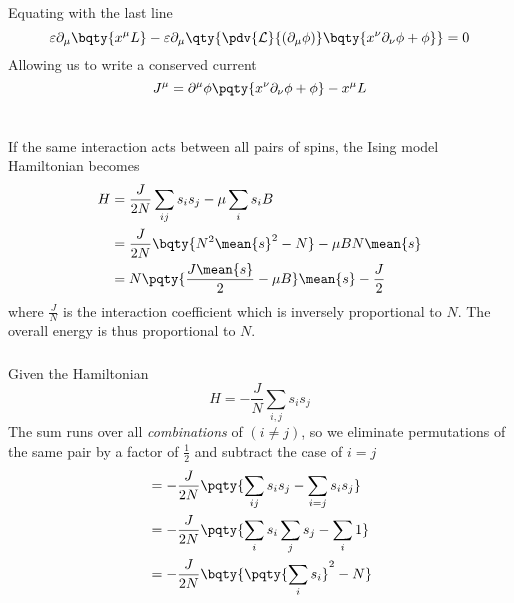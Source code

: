 \documentclass[12pt]{article}
\begin{document}
        Equating with the last line \[
            \varepsilon \partial_\mu\bqty{ x^\mu L } - \varepsilon \partial_\mu\qty{ \pdv{\mathcal{L}}{(\partial_\mu \phi)}\bqty{x^\nu \partial_\nu {\phi} + \phi} } = 0
        \]
        Allowing us to write a conserved current \[
            J^\mu =  \partial^\mu \phi\pqty{x^\nu \partial_\nu {\phi} + \phi} - x^\mu L
        \]
    \newpage
    \section{}
    \subsection{} \subsubsection{} If the same interaction acts between all pairs of spins, the Ising model Hamiltonian becomes 
        \begin{align*}
            H &=  \frac{J}{2N} \sum_{ij} s_i s_j - \mu \sum_i s_i B\\
            &= \frac{J}{2N} \bqty{N^2 \mean{s}^2 - N}- \mu B N\mean{s}\\
            &= N \pqty{\frac{J\mean{s}}{2} - \mu B}\mean{s} - \frac{J}{2}
        \end{align*}
        where \(\frac{J}{N}\) is the interaction coefficient which is inversely proportional to \(N\). The overall energy is thus proportional to \(N\).
        \subsubsection{} Given the Hamiltonian \begin{equation*}
            H = - \frac{J}{N}\sum_{i,j}s_i s_j
        \end{equation*} 
        The sum runs over all \emph{combinations} of \((i\neq j)\), so we eliminate permutations of the same pair by a factor of \(\frac{1}{2}\) and subtract the case of \(i = j\)
        \begin{align*}
            &= - \frac{J}{2N}\pqty{\sum_{i j}s_i s_j - \sum_{i = j} s_i s_j}\\
            &= - \frac{J}{2N}\pqty{\sum_{i}s_i \sum_j s_j - \sum_{i} 1}\\
            &= - \frac{J}{2N}\bqty{\pqty{\sum_{i}s_i}^2 - N}
        \end{align*}
\end{document}
